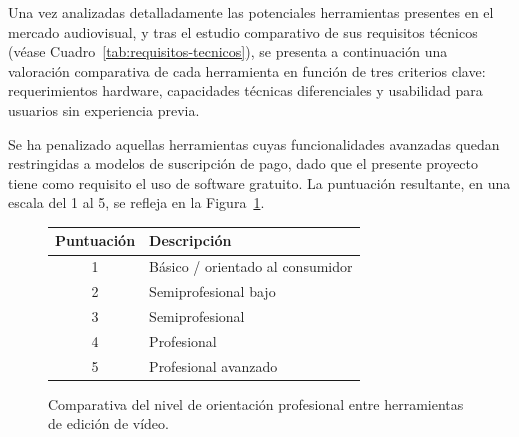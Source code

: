 Una vez analizadas detalladamente las potenciales herramientas presentes en el mercado audiovisual,
y tras el estudio comparativo de sus requisitos técnicos (véase Cuadro~\ref{tab:requisitos-tecnicos}),
se presenta a continuación una valoración comparativa de cada herramienta en función de tres criterios
clave: requerimientos hardware, capacidades técnicas diferenciales y usabilidad para usuarios sin
experiencia previa.

Se ha penalizado aquellas herramientas cuyas funcionalidades avanzadas quedan restringidas a modelos
de suscripción de pago, dado que el presente proyecto tiene como requisito el uso de software gratuito.
La puntuación resultante, en una escala del 1 al 5, se refleja en la Figura~\ref{fig:comparativa-herramientas}.

\begin{figure}[H]
\centering
{}


\bigskip
\bigskip
\begin{tabular}{cl}
    \hline
    \textbf{Puntuación} & \textbf{Descripción} \\
    \hline
    1 & Básico / orientado al consumidor \\
    2 & Semiprofesional bajo \\
    3 & Semiprofesional \\
    4 & Profesional \\
    5 & Profesional avanzado \\
    \hline
\end{tabular}
\centering
\caption{Comparativa del nivel de orientación profesional entre herramientas de edición de vídeo.}
\label{fig:comparativa-herramientas}
\end{figure}

